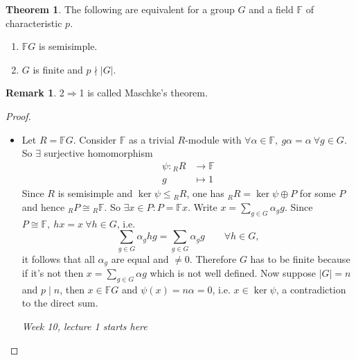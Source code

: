 \documentclass[a4paper]{article}
\newcommand{\F}{\mathbb{F}}
\theoremstyle{definition}
\newtheorem{thm}[defn]{Theorem}
\newtheorem*{remark}{Remark}
\begin{document}
\begin{thm}
The following are equivalent for a group $G$ and a field $\F$ of characteristic $p$.
\begin{enumerate}
\item $\F G$ is semisimple.
\item $G$ is finite and $p\nmid |G|$.
\end{enumerate}
\end{thm}
\begin{remark}
2$\Rightarrow$1 is called Maschke's theorem.
\end{remark}
\begin{proof}
\begin{itemize}
\item[1$\Rightarrow$2:] Let $R=\F G$. Consider $\F$ as a trivial $R$-module with $\forall\alpha\in\F,\ g\alpha=\alpha \ \forall g\in G$. So $\exists$ surjective homomorphism
\[
\begin{aligned}
\psi:{}_RR&\rightarrow\F\\
g&\mapsto 1
\end{aligned}
\]
Since $R$ is semisimple and $\ker\psi\leq{}_RR$, one has $_RR=\ker\psi\oplus P$ for some $P$ and hence $_RP\cong{}_R\F$. So $\exists x\in P:P=\F x$. Write $x=\sum_{g\in G}\alpha_g g$. Since $P\cong\F,\ hx=x\ \forall h\in G$, i.e.
\[
\sum_{g\in G}\alpha_g hg=\sum_{g\in G}\alpha_g g\qquad\forall h\in G,
\]
it follows that all $\alpha_g$ are equal and $\neq 0$. Therefore $G$ has to be finite because if it's not then $x=\sum_{g\in G}\alpha g$ which is not well defined. Now suppose $|G|=n$ and $p\mid n$, then $x\in\F G$ and $\psi(x)=n\alpha=0$, i.e. $x\in\ker\psi$, a contradiction to the direct sum.

\begin{flushright}
\textit{Week 10, lecture 1 starts here}
\end{flushright}


\end{itemize}
\end{proof}
\end{document}
